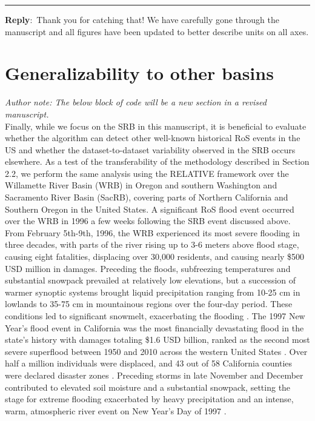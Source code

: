 \documentclass{article}
\newcommand{\genDisc}[1]{\medskip \hrule \vspace{0.25cm}
               {\itshape {\color{violet}{#1}\color{black}} }}
\newcommand{\reply}{\vspace{0.25cm} \textbf{Reply}:\ }
\begin{document}
\genDisc{Provide units at all axes go all figures.}

\reply{Thank you for catching that! We have carefully gone through the manuscript and all figures have been updated to better describe units on all axes.}

\appendix
\renewcommand{\thesection}{Appendix \Alph{section}:}
\section{Generalizability to other basins}

\textit{Author note: The below block of code will be a new section in a revised manuscript.}\\

Finally, while we focus on the SRB in this manuscript, it is beneficial to evaluate whether the algorithm can detect other well-known historical RoS events in the US and whether the dataset-to-dataset variability observed in the SRB occurs elsewhere.
As a test of the transferability of the methodology described in Section 2.2, we perform the same analysis using the RELATIVE framework over the Willamette River Basin (WRB) in Oregon and southern Washington and Sacramento River Basin (SacRB), covering parts of Northern California and Southern Oregon in the United States.
A significant RoS flood event occurred over the WRB in 1996 a few weeks following the SRB event discussed above.
From February 5th-9th, 1996, the WRB experienced its most severe flooding in three decades, with parts of the river rising up to 3-6 meters above flood stage, causing eight fatalities, displacing over 30,000 residents, and causing nearly \$500 USD million in damages.
Preceding the floods, subfreezing temperatures and substantial snowpack prevailed at relatively low elevations, but a succession of warmer synoptic systems brought liquid precipitation ranging from 10-25 cm in lowlands to 35-75 cm in mountainous regions over the four-day period.
These conditions led to significant snowmelt, exacerbating the flooding \citep{halpert1997climate,colle2000february}.
The 1997 New Year's flood event in California was the most financially devastating flood in the state's history with damages totaling \$1.6 USD billion, ranked as the second most severe superflood between 1950 and 2010 across the western United States \citep{tarouilly2021western}.
Over half a million individuals were displaced, and 43 out of 58 California counties were declared disaster zones \citep{lott1997}.
Preceding storms in late November and December contributed to elevated soil moisture and a substantial snowpack, setting the stage for extreme flooding exacerbated by heavy precipitation and an intense, warm, atmospheric river event on New Year's Day of 1997 \citep{galewsky2005moist,rhoades2023recreating}.
\end{document}
